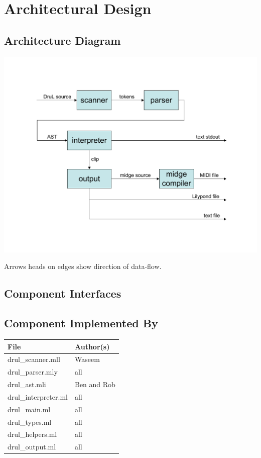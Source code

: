 
\chapter{Architectural Design}

\section{Architecture Diagram}

\includegraphics[width=150mm]{Architecture_diagram.pdf}

Arrows heads on edges show direction of data-flow.

\section{Component Interfaces}

\section{Component Implemented By}

\begin{tabular}{ | l | l | } \hline
	\textbf{File}        & \textbf{Author(s)} \\ \hline \hline
	drul\_scanner.mll    & Waseem             \\ \hline
	drul\_parser.mly     & all                \\ \hline
	drul\_ast.mli        & Ben and Rob        \\ \hline
	drul\_interpreter.ml & all                \\ \hline
	drul\_main.ml        & all                \\ \hline
	drul\_types.ml       & all                \\ \hline
	drul\_helpers.ml     & all                \\ \hline
	drul\_output.ml      & all                \\ \hline
\end{tabular}

